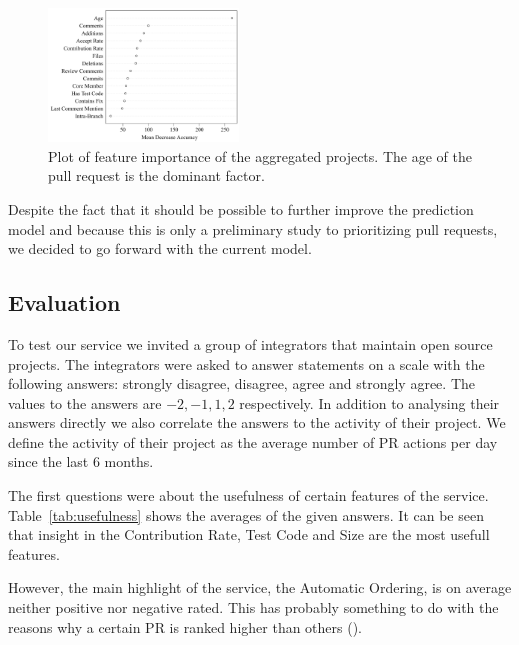 \begin{figure}
  \centering
  \includegraphics[width=0.45\textwidth]{../figs/mean-decrease-accuracy.pdf}
  \caption[Plot of feature importance]
   {Plot of feature importance of the aggregated projects. The age of the pull request is the dominant factor.}
  \label{fig:feature-importance}
\end{figure}

Despite the fact that it should be possible to further improve the prediction model and because this is only a preliminary study to prioritizing pull requests, we decided to go forward with the current model.

\subsection{Evaluation}
\label{sec:evaluation}

To test our service we invited a group of integrators that maintain open source projects.
The integrators were asked to answer statements on a scale with the following answers: strongly disagree, disagree, agree and strongly agree.
The values to the answers are ${-2, -1, 1, 2}$ respectively.
In addition to analysing their answers directly we also correlate the answers to the activity of their project.
We define the activity of their project as the average number of PR actions per day since the last 6 months.

The first questions were about the usefulness of certain features of the service.
Table~\ref{tab:usefulness} shows the averages of the given answers.
It can be seen that insight in the Contribution Rate, Test Code and Size are the most usefull features.


However, the main highlight of the service, the Automatic Ordering, is on average neither positive nor negative rated.
This has probably something to do with the reasons why a certain PR is ranked higher than others ().

